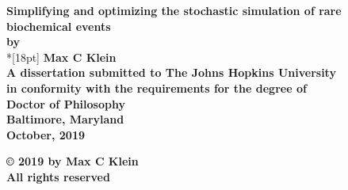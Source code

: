 \documentclass[12pt]{report}
\begin{document}
\thispagestyle{empty}
\begin{center}
\vspace*{.25in}
{\bf\LARGE{ Simplifying and optimizing the stochastic simulation of rare biochemical events }}\\ %
\vspace*{.75in}
{\bf by} \\*[18pt]
\vspace*{.2in}
{\bf Max C Klein}\\ %
\vspace*{1in}
{\bf A dissertation submitted to The Johns Hopkins University\\
in conformity with the requirements for the degree of\\
Doctor of Philosophy }\\
\vspace*{.75in}
{\bf Baltimore, Maryland} \\
{\bf October, 2019} \\     %
\vspace*{.5in}
\begin{small}
{\bf \copyright{ }2019 by Max C Klein} \\ %
{\bf All rights reserved}
\end{small}
\end{center}
\newpage 

\pagestyle{plain}
\setcounter{page}{2}

%


\pagestyle{plain}
\baselineskip=24pt
\tableofcontents
\listoftables
\listoffigures

\cleardoublepage %

\begin{refsection}

\cleardoublepage
{}
\printbibliography[title={References}]
\end{refsection}

\begin{refsection}

\cleardoublepage
{}
\printbibliography[title={References}]
\end{refsection}
\end{document}
